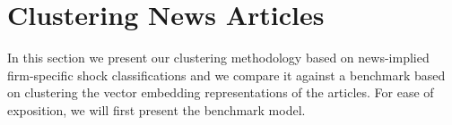 \section{Clustering News Articles}

In this section we present our clustering methodology based on news-implied firm-specific shock classifications and we compare it against a benchmark based on clustering the vector embedding representations of the articles. For ease of exposition, we will first present the benchmark model.







